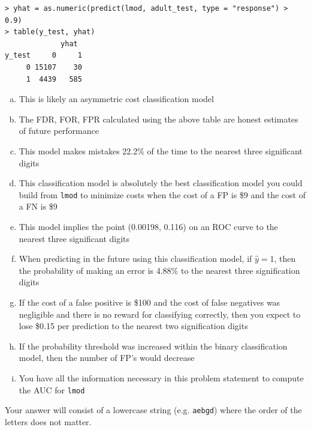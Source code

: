 \documentclass[12pt,landscape]{article}
\newcommand{\instr}{\small Your answer will consist of a lowercase string (e.g. \texttt{aebgd}) where the order of the letters does not matter. \normalsize}
\begin{document}
\lstset{
  basicstyle=\footnotesize,
  xleftmargin=.15\textwidth, xrightmargin=.15\textwidth
}
\begin{lstlisting}
> yhat = as.numeric(predict(lmod, adult_test, type = "response") > 0.9)
> table(y_test, yhat)
             yhat
y_test     0     1
     0 15107    30
     1  4439   585
\end{lstlisting}

\vspace{-0.8cm}\benum{}

\begin{enumerate}[(a)]
\item This is likely an asymmetric cost classification model
\item The FDR, FOR, FPR calculated using the above table are honest estimates of future performance
\item This model makes mistakes 22.2\% of the time to the nearest three significant digits
\item This classification model is absolutely the best classification model you could build from \texttt{lmod} to minimize costs when the cost of a FP is \$9 and the cost of a FN is \$9
\item This model implies the point (0.00198, 0.116) on an ROC curve to the nearest three significant digits
\item When predicting in the future using this classification model, if $\hat{y} = 1$, then the probability of making an error is 4.88\% to the nearest three signification digits
\item If the cost of a false positive is \$100 and the cost of false negatives was negligible and there is no reward for classifying correctly, then you expect to lose \$0.15 per prediction to the nearest two signification digits
\item If the probability threshold was increased within the binary classification model, then the number of FP's would decrease
\item You have all the information necessary in this problem statement to compute the AUC for \texttt{lmod}
\end{enumerate}
\eenum\instr\pagebreak
\end{document}
